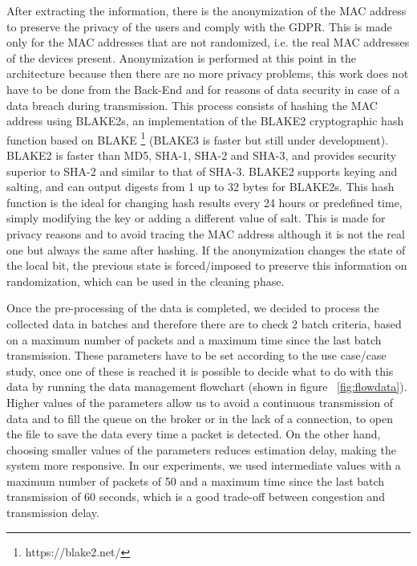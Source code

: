 After extracting the information, there is the anonymization of the MAC address to preserve the privacy of the users and comply with the GDPR. This is made only for the MAC addresses that are not randomized, i.e. the real MAC addresses of the devices present. Anonymization is performed at this point in the architecture because then there are no more privacy problems, this work does not have to be done from the Back-End and for reasons of data security in case of a data breach during transmission.
This process consists of hashing the MAC address using BLAKE2s, an implementation of the BLAKE2  cryptographic hash function based on BLAKE  \footnote{https://blake2.net/} (BLAKE3 is faster but still under development). BLAKE2 is faster than MD5, SHA-1, SHA-2 and SHA-3, and provides security superior to SHA-2 and similar to that of SHA-3. BLAKE2 supports keying and salting, and can output digests from 1 up to 32 bytes for BLAKE2s. This hash function is the ideal for changing hash results every 24 hours or predefined time, simply modifying the key or adding a different value of salt. This is made for privacy reasons and to avoid tracing the MAC address although it is not the real one but always the same after hashing.
If the anonymization changes the state of the local bit, the previous state is forced/imposed to preserve this information on randomization, which can be used in the cleaning phase.

Once the pre-processing of the data is completed, we decided to process the collected data in batches and therefore there are to check 2 batch criteria, based on a maximum number of packets and a maximum time since the last batch transmission. These parameters have to be set according to the use case/case study, once one of these is reached it is possible to decide what to do with this data by running the data management flowchart (shown in figure ~\ref{fig:flowdata}).
Higher values of the parameters allow us to avoid a continuous transmission of data and to fill the queue on the broker or in the lack of a connection, to open the file to save the data every time a packet is detected. On the other hand, choosing smaller values of the parameters reduces estimation delay, making the system more responsive. In our experiments, we used intermediate values with a maximum number of packets of 50 and a maximum time since the last batch transmission of 60 seconds, which is a good trade-off between congestion and transmission delay.

